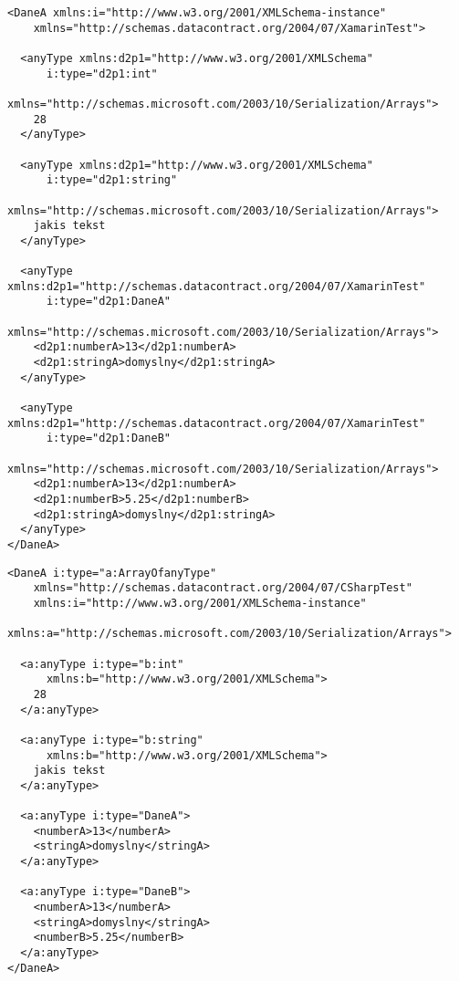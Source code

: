 \begin{description}
\begin{lstlisting}[float, caption={Testowa tablica zserializowana przez \texttt{DataContractSerializer} pod Mono.}, label=code:xamrinArray]
<DaneA xmlns:i="http://www.w3.org/2001/XMLSchema-instance"
    xmlns="http://schemas.datacontract.org/2004/07/XamarinTest">
  
  <anyType xmlns:d2p1="http://www.w3.org/2001/XMLSchema"
      i:type="d2p1:int"
      xmlns="http://schemas.microsoft.com/2003/10/Serialization/Arrays">
    28
  </anyType>
  
  <anyType xmlns:d2p1="http://www.w3.org/2001/XMLSchema"
      i:type="d2p1:string"
      xmlns="http://schemas.microsoft.com/2003/10/Serialization/Arrays">
    jakis tekst
  </anyType>
  
  <anyType xmlns:d2p1="http://schemas.datacontract.org/2004/07/XamarinTest"
      i:type="d2p1:DaneA"
      xmlns="http://schemas.microsoft.com/2003/10/Serialization/Arrays">
    <d2p1:numberA>13</d2p1:numberA>
    <d2p1:stringA>domyslny</d2p1:stringA>
  </anyType>
  
  <anyType xmlns:d2p1="http://schemas.datacontract.org/2004/07/XamarinTest"
      i:type="d2p1:DaneB"
      xmlns="http://schemas.microsoft.com/2003/10/Serialization/Arrays">
    <d2p1:numberA>13</d2p1:numberA>
    <d2p1:numberB>5.25</d2p1:numberB>
    <d2p1:stringA>domyslny</d2p1:stringA>
  </anyType>
</DaneA>
\end{lstlisting}

\begin{lstlisting}[float, caption={Testowa tablica zserializowana przez \texttt{DataContractSerializer} pod .NET 4.5.}, label=code:dotNetArray]
<DaneA i:type="a:ArrayOfanyType"
    xmlns="http://schemas.datacontract.org/2004/07/CSharpTest"
    xmlns:i="http://www.w3.org/2001/XMLSchema-instance"
    xmlns:a="http://schemas.microsoft.com/2003/10/Serialization/Arrays">
    
  <a:anyType i:type="b:int"
      xmlns:b="http://www.w3.org/2001/XMLSchema">
    28
  </a:anyType>
  
  <a:anyType i:type="b:string"
      xmlns:b="http://www.w3.org/2001/XMLSchema">
    jakis tekst
  </a:anyType>
  
  <a:anyType i:type="DaneA">
    <numberA>13</numberA>
    <stringA>domyslny</stringA>
  </a:anyType>
  
  <a:anyType i:type="DaneB">
    <numberA>13</numberA>
    <stringA>domyslny</stringA>
    <numberB>5.25</numberB>
  </a:anyType>
</DaneA>
\end{lstlisting}

\end{description}

